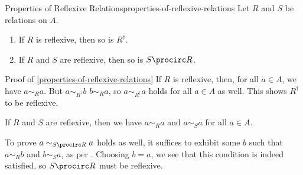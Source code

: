 \begin{proposition}{Properties of Reflexive Relations}{properties-of-reflexive-relations}%
    Let $R$ and $S$ be relations on $A$.
    \begin{enumerate}
        \item\label{properties-of-reflexive-relations-interaction-with-inverses}If $R$ is reflexive, then so is $R^{\dagger}$.
        \item\label{properties-of-reflexive-relations-interaction-with-composition}If $R$ and $S$ are reflexive, then so is $S\procirc R$.
    \end{enumerate}
\end{proposition}
\begin{Proof}{Proof of \cref{properties-of-reflexive-relations}}%
    If $R$ is reflexive, then, for all $a\in A$, we have $a\sim_{R}a$. But $a\sim_{R^{\dagger}}b$ \textiff $b\sim_{R}a$, so $a\sim_{R^{\dagger}}a$ holds for all $a\in A$ as well. This shows $R^{\dagger}$ to be reflexive.

    If $R$ and $S$ are reflexive, then we have $a\sim_{R}a$ and $a\sim_{S}a$ for all $a\in A$.

    \indent To prove $a\sim_{S\procirc R}a$ holds as well, it suffices to exhibit some $b$ such that $a\sim_{R}b$ and $b\sim_{S}a$, as per . Choosing $b=a$, we see that this condition is indeed satisfied, so $S\procirc R$ must be reflexive.
\end{Proof}
